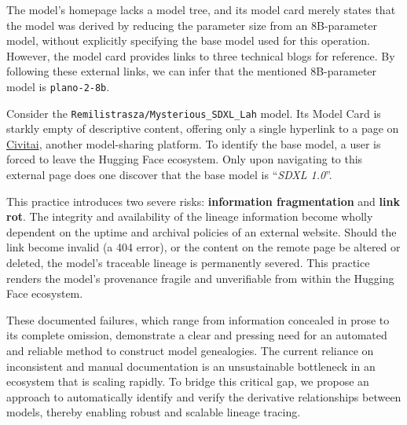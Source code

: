 \begin{tcolorbox}[
        title={\textbf{Case Study 3: \texttt{pfnet/plamo-2.1-2b-cpt}}},
        colback=gray!5!white, %
        colframe=gray!75!black, %
        fonttitle=\bfseries, %
        sharp corners %
    ]
    The model's homepage lacks a model tree, and its model card merely states that the model was derived by reducing the parameter size from an 8B-parameter model, without explicitly specifying the base model used for this operation. However, the model card provides links to three technical blogs for reference. By following these external links, we can infer that the mentioned 8B-parameter model is \texttt{plano-2-8b}.

\end{tcolorbox}

\begin{tcolorbox}[
        title={\textbf{Case Study 4: \texttt{Remilistrasza/Mysterious\_SDXL\_Lah}}},
        colback=gray!5!white,
        colframe=gray!75!black,
        fonttitle=\bfseries,
        sharp corners
    ]
    Consider the \texttt{Remilistrasza/Mysterious\_SDXL\_Lah} model. Its Model Card is starkly empty of descriptive content, offering only a single hyperlink to a page on \href{https://civitai.com/}{Civitai}, another model-sharing platform. To identify the base model, a user is forced to leave the Hugging Face ecosystem. Only upon navigating to this external page does one discover that the base model is “\textit{SDXL 1.0}”.

\end{tcolorbox}

This practice introduces two severe risks: \textbf{information fragmentation} and \textbf{link rot}. The integrity and availability of the lineage information become wholly dependent on the uptime and archival policies of an external website. Should the link become invalid (a 404 error), or the content on the remote page be altered or deleted, the model's traceable lineage is permanently severed. This practice renders the model's provenance fragile and unverifiable from within the Hugging Face ecosystem.

These documented failures, which range from information concealed in prose to its complete omission, demonstrate a clear and pressing need for an automated and reliable method to construct model genealogies. The current reliance on inconsistent and manual documentation is an unsustainable bottleneck in an ecosystem that is scaling rapidly. To bridge this critical gap, we propose an approach to automatically identify and verify the derivative relationships between models, thereby enabling robust and scalable lineage tracing.


